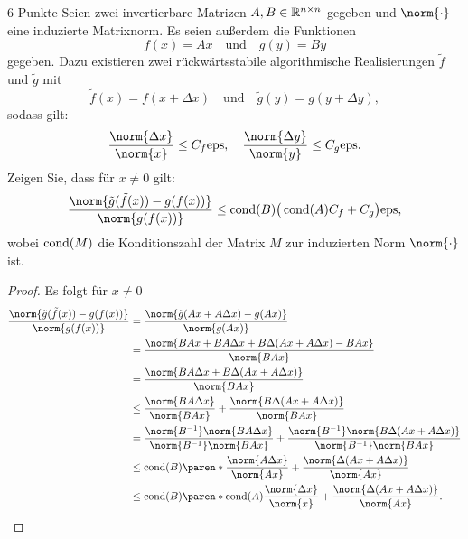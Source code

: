 \documentclass{problemset}
\author{Michael van Straten}
\begin{document}
\maketitle

\setcounter{problem}{2}

\begin{problem}{6 Punkte}
Seien zwei invertierbare Matrizen \(A, B \in \mathbb{R}^{n \times n}\)
gegeben und \(\norm{\cdot}\) eine induzierte Matrixnorm. Es seien außerdem die
Funktionen
\[
    f(x) = Ax \quad \text{und} \quad g(y) = By
\]
gegeben. Dazu existieren zwei rückwärtsstabile algorithmische Realisierungen
  \(\tilde{f}\) und \(\tilde{g}\) mit
\[
    \tilde{f}(x) = f(x + \Delta x) \quad \text{und} \quad \tilde{g}(y) = g(y + \Delta y),
\]
sodass gilt:
\begin{equation*}
    \frac{\norm{\Delta x}}{\norm{x}} \leq C_f \text{eps},
    \quad \frac{\norm{\Delta y}}{\norm{y}} \leq C_g \text{eps}.
\end{equation*}
Zeigen Sie, dass für \(x \neq 0\) gilt:
\begin{equation*}
    \frac{\norm{\tilde{g}(\tilde{f}(x)) - g(f(x))}}{\norm{g(f(x))}}
    \leq \cond(B) \big(\cond(A) C_f + C_g \big) \text{eps},
\end{equation*}
wobei \(\operatorname{cond}(M)\) die Konditionszahl der Matrix \(M\) zur
induzierten Norm \(\norm{\cdot}\) ist.

\begin{proof}
    Es folgt für \(x \neq 0\)
    \begin{align*}
        \frac{\norm{\tilde{g}(\tilde{f}(x)) - g(f(x))}}{\norm{g(f(x))}}
         & = \frac{\norm{\tilde{g}(Ax+ A \Delta x) - g(Ax)}}{\norm{g(Ax)}}                                  \\
         & = \frac{\norm{BAx + B A \Delta x + B \Delta (Ax + A \Delta x) -
        BAx}}{\norm{BAx}}                                                                                   \\
         & = \frac{\norm{BA \Delta x + B \Delta (Ax + A \Delta x)}}{\norm{BAx}}                             \\
         & \le \frac{\norm{BA \Delta x}}{\norm{BAx}} + \frac{\norm{B \Delta (Ax + A \Delta x)}}{\norm{BAx}} \\
         & = \frac{\norm{B^{-1}}\norm{BA \Delta x}}{\norm{B^{-1}}\norm{BAx}}
        + \frac{\norm{B^{-1}}\norm{B \Delta (Ax + A \Delta x)}}{\norm{B^{-1}}\norm{BAx}}                    \\
         & \le \cond(B) \paren*{ \frac{\norm{A \Delta x}}{\norm{Ax}}
        + \frac{\norm{\Delta (Ax + A \Delta x)}}{\norm{Ax}}}                                                \\
         & \le \cond(B) \paren*{ \cond(A) \frac{\norm{\Delta x}}{\norm{x}}
            + \frac{\norm{\Delta (Ax + A \Delta x)}}{\norm{Ax}}}.
    \end{align*}


\end{proof}
\end{problem}
\end{document}
